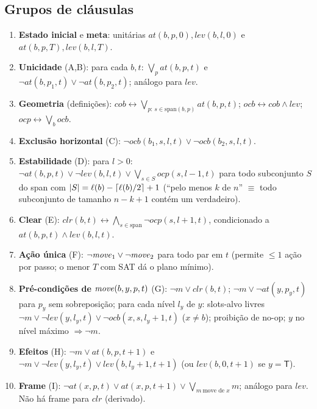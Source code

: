 \documentclass[11pt,a4paper]{article}
\newcommand{\at}{\mathit{at}}\newcommand{\lev}{\mathit{lev}}\newcommand{\clr}{\mathit{clr}}
\newcommand{\Tm}{\mathsf{T}}
\begin{document}
\subsection{Grupos de cláusulas}
\begin{enumerate}\setlength\itemsep{2pt}
\item \textbf{Estado inicial} e \textbf{meta}: unitárias $\at(b,p,0),\lev(b,l,0)$ e $\at(b,p,T),\lev(b,l,T)$.
\item \textbf{Unicidade} (A,B): para cada $b,t$: $\bigvee_p\at(b,p,t)$ e $\neg\at(b,p_1,t)\vee\neg\at(b,p_2,t)$; análogo para $\lev$.
\item \textbf{Geometria} (definições): $\mathit{cob}\leftrightarrow\bigvee_{p:\,s\in\mathrm{span}(b,p)}\at(b,p,t)$; $\mathit{ocb}\leftrightarrow\mathit{cob}\wedge\lev$; $\mathit{ocp}\leftrightarrow\bigvee_b\mathit{ocb}$.
\item \textbf{Exclusão horizontal} (C): $\neg\mathit{ocb}(b_1,s,l,t)\vee\neg\mathit{ocb}(b_2,s,l,t)$.
\item \textbf{Estabilidade} (D): para $l>0$: $\neg\at(b,p,t)\vee\neg\lev(b,l,t)\vee\bigvee_{s\in S}\mathit{ocp}(s,l-1,t)$ para todo subconjunto $S$ do span com $|S|=\ell(b)-\lceil\ell(b)/2\rceil+1$ (``pelo menos $k$ de $n$'' $\equiv$ todo subconjunto de tamanho $n-k+1$ contém um verdadeiro).
\item \textbf{Clear} (E): $\clr(b,t)\leftrightarrow\bigwedge_{s\in\mathrm{span}}\neg\mathit{ocp}(s,l+1,t)$, condicionado a $\at(b,p,t)\wedge\lev(b,l,t)$.
\item \textbf{Ação única} (F): $\neg\mathit{move}_1\vee\neg\mathit{move}_2$ para todo par em $t$ (permite $\le1$ ação por passo; o menor $T$ com SAT dá o plano mínimo).
\item \textbf{Pré-condições de $\mathit{move}(b,y,p,t)$} (G): $\neg m\vee\clr(b,t)$; $\neg m\vee\neg\at(y,p_y,t)$ para $p_y$ sem sobreposição; para cada nível $l_y$ de $y$: slots-alvo livres $\neg m\vee\neg\lev(y,l_y,t)\vee\neg\mathit{ocb}(x,s,l_y+1,t)$ ($x\ne b$); proibição de no-op; $y$ no nível máximo $\Rightarrow\neg m$.
\item \textbf{Efeitos} (H): $\neg m\vee\at(b,p,t+1)$ e $\neg m\vee\neg\lev(y,l_y,t)\vee\lev(b,l_y+1,t+1)$ (ou $\lev(b,0,t+1)$ se $y=\Tm$).
\item \textbf{Frame} (I): $\neg\at(x,p,t)\vee\at(x,p,t+1)\vee\bigvee_{m\ \text{move de }x}m$; análogo para $\lev$. Não há frame para $\clr$ (derivado).
\end{enumerate}

\end{document}
